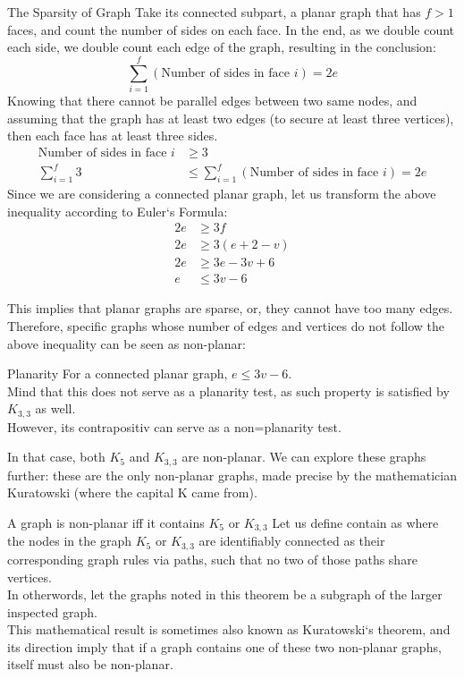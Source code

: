 \begin{ln-theorem}{The Sparsity of Graph}{}
    Take its connected subpart, a planar graph that has $f > 1$ faces, and count the number of sides on each face. In the end, as we double count each side, we double count each edge of the graph, resulting in the conclusion:
    \[\sum_{i = 1}^f (\text{Number of sides in face $i$}) = 2e\]
    Knowing that there cannot be parallel edges between two same nodes, and assuming that the graph has at least two edges (to secure at least three vertices), then each face has at least three sides. \\
    \begin{align*}
        \text{Number of sides in face $i$} &\geq 3 \\
        \sum_{i = 1}^f 3 &\leq \sum_{i = 1}^f (\text{Number of sides in face $i$}) = 2e
    \end{align*}
    Since we are considering a connected planar graph, let us transform the above inequality according to Euler`s Formula:
    \begin{align*}
        2e &\geq 3f \\
        2e &\geq 3(e + 2 - v) \\
        2e &\geq 3e - 3v + 6 \\
        e &\leq 3v - 6
    \end{align*}
\end{ln-theorem}
This implies that planar graphs are sparse, or, they cannot have too many edges. \\
Therefore, specific graphs whose number of edges and vertices do not follow the above inequality can be seen as non-planar:
\begin{ln-define}{Planarity}{}
    For a connected planar graph, $e \leq 3v - 6$. \\
    Mind that this does not serve as a planarity test, as such property is satisfied by $K_{3, 3}$ as well. \\
    However, its contrapositiv can serve as a non=planarity test.
\end{ln-define}
In that case, both $K_5$ and $K_{3,3}$ are non-planar. We can explore these graphs further: these are the only non-planar graphs, made precise by the mathematician Kuratowski (where the capital K came from).
\begin{ln-theorem}{A graph is non-planar iff it contains $K_5$ or $K_{3,3}$}{}
    Let us define contain as where the nodes in the graph $K_5$ or $K_{3,3}$ are identifiably connected as their corresponding graph rules via paths, such that no two of those paths share vertices. \\
    In otherwords, let the graphs noted in this theorem be a subgraph of the larger inspected graph. \\
    This mathematical result is sometimes also known as Kuratowski`s theorem, and its direction imply that if a graph contains one of these two non-planar graphs, itself must also be non-planar.
\end{ln-theorem}

